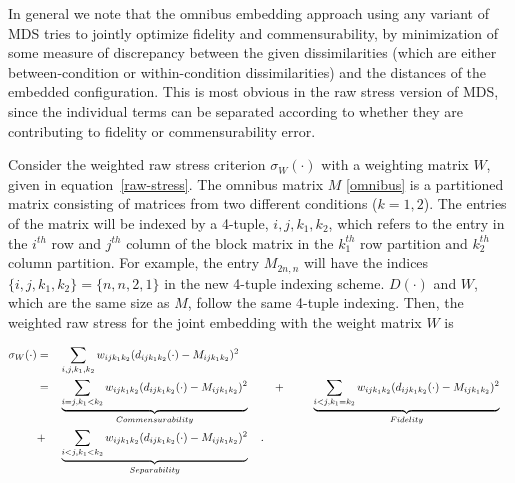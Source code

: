 \documentclass[12pt,oneside,final]{thesis}\usepackage[]{graphicx}\usepackage[]{color}
\begin{document}
In general we note that the omnibus embedding approach using any variant of MDS tries to jointly optimize fidelity and commensurability, by minimization of some measure of discrepancy between the given dissimilarities (which are either between-condition or within-condition dissimilarities) and the distances of the embedded configuration. This is most obvious in the  raw stress version of  MDS, since the individual terms can be separated according to whether they are contributing to  fidelity or  commensurability  error.

 Consider the weighted raw stress criterion $\sigma_{W}(\cdot)$ with a weighting matrix $W$, given in equation~\eqref{raw-stress}.
 The omnibus matrix $M$ \eqref{omnibus}  is a partitioned matrix consisting of matrices from two different conditions ($k={1,2}$). The entries of the matrix will be indexed by a 4-tuple, ${i,j,k_1,k_2}$, which refers to the entry in the $i^{th}$ row and $j^{th}$ column of the block matrix in  the $k_1^{th}$  row partition and   $k_2^{th}$ column partition. For example, the entry ${M}_{2n,n}$ will have the indices $\{i,j,k_1,k_2\}=\{n,n,2,1\}$ in the new 4-tuple indexing scheme. $D(\cdot)$ and $W$, which are the same size as $M$, follow the same 4-tuple indexing. Then, the weighted raw stress for the joint embedding with the weight matrix $W$ is
 
\begin{align}
\sigma_W(\cdot)  &= & &\sum_{i,j,k_1,k_2} {w_{ij{k_1}{k_2}}(d_{ij{k_1}{k_2}}(\cdot)-M_{ijk_1k_2})^2 } \notag\\
\hspace{3pt} &=& &\underbrace{\sum_{i=j,k_1<k_2}  {w_{ij{k_1}{k_2}}(d_{ij{k_1}{k_2}}(\cdot)-M_{ijk_1k_2})^2}}_{Commensurability}  \hspace{10pt}  &  + &\hspace{2.5em} \underbrace{\sum_{i<j,k_1=k_2}  {w_{ij{k_1}{k_2}}(d_{ij{k_1}{k_2}}(\cdot)-M_{ijk_1k_2})^2  }  } _{Fidelity}\notag\\
\hspace{3pt}&+&  &\underbrace{\sum_{i< j,k_1<k_2}  {w_{ij{k_1}{k_2}}(d_{ij{k_1}{k_2}}(\cdot)-M_{ijk_1k_2})^2  }  } _{Separability}\label{eq:FidCommSep}\hspace{10pt} .
\end{align}
\end{document}
